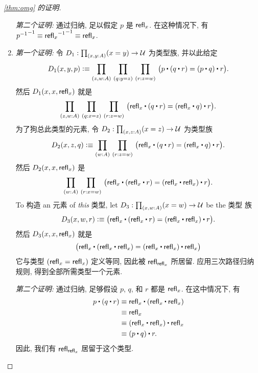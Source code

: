 \begin{proof}[\cref{thm:omg} 的证明]
\begin{enumerate}
\mentalpause

\noindent \emph{第二个证明:} 通过归纳, 足以假定 $p$ 是 $\mathsf{refl}_{x}$.
在这种情况下, 有 $\mathord{{\mathord{{p}^{-1}}}^{-1}}\equiv \mathord{{\mathord{{\mathsf{refl}_{x}}^{-1}}}^{-1}} \equiv \mathsf{refl}_{x}$.

\item \emph{第一个证明:} 令 $D_1:\prd{x,y:A} (x=y) \to \type$ 为类型族, 并以此给定
\begin{equation*}
D_1(x,y,p)\defeq\prd{z,w:A}{q:y= z}{r:z= w} \big(p\ct (q\ct r)= (p\ct q)\ct r\big).
\end{equation*}
然后 $D_1(x,x,\mathsf{refl}_{x})$ 就是
\begin{equation*}
\prd{z,w:A}{q:x= z}{r:z= w} \big(\refl{x}\ct(q\ct r)= (\refl{x}\ct q)\ct r\big).
\end{equation*}
为了狗总此类型的元素, 令 $D_2:\prd{x,z:A} (x=z) \to \type$ 为类型族
\begin{equation*}
D_2 (x,z,q) \defeq \prd{w:A}{r:z=w} \big(\refl{x}\ct(q\ct r)= (\refl{x}\ct q)\ct r\big).
\end{equation*}
然后 $D_2(x,x,\mathsf{refl}_{x})$ 是
\begin{equation*}
\prd{w:A}{r:x=w} \big(\refl{x}\ct(\refl{x}\ct r)= (\refl{x}\ct \refl{x})\ct r\big).
\end{equation*}
To 构造 an 元素 of \emph{this} 类型, let $D_3:\prd{x,w:A} (x=w) \to \type$ be the 类型 族
\begin{equation*}
D_3(x,w,r) \defeq \big(\refl{x}\ct(\refl{x}\ct r)= (\refl{x}\ct \refl{x})\ct r\big).
\end{equation*}
然后 $D_3(x,x,\mathsf{refl}_{x})$ 就是
\begin{equation*}
\big(\refl{x}\ct(\refl{x}\ct \refl{x})= (\refl{x}\ct \refl{x})\ct \refl{x}\big)
\end{equation*}
它与类型 $(\mathsf{refl}_{x} = \mathsf{refl}_{x})$ 定义等同, 因此被 $\mathsf{refl}_{\mathsf{refl}_{x}}$ 所居留.
应用三次路径归纳规则, 得到全部所需类型一个元素.

\mentalpause

\noindent \emph{第二个证明:} 通过归纳, 足够假设 $p$, $q$, 和 $r$ 都是 $\mathsf{refl}_{x}$.
在这中情况下, 有
\begin{align*}
p\ct (q\ct r)
&\jdeq \refl{x}\ct(\refl{x}\ct \refl{x})\\
&\jdeq \refl{x}\\
&\jdeq (\refl{x}\ct \refl x)\ct \refl x\\
&\jdeq (p\ct q)\ct r.
\end{align*}
因此, 我们有 $\mathsf{refl}_{\mathsf{refl}_{x}}$ 居留于这个类型. \qedhere
\end{enumerate}
\end{proof}

